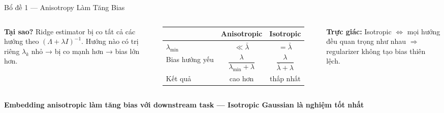 \documentclass[aspectratio=169,9pt]{beamer}
\newcommand{\takeaway}[1]{%
  \vfill
  \begin{mdframed}[
    linecolor=maccent, linewidth=1.5pt,
    backgroundcolor=mlightgold,
    innertopmargin=5pt, innerbottommargin=5pt,
    innerleftmargin=10pt, innerrightmargin=10pt,
    roundcorner=3pt, skipabove=4pt, skipbelow=0pt
  ]
  \centering\small\bfseries\color{mprimary} #1
  \end{mdframed}%
}
\begin{document}
\begin{frame}{Bổ đề 1 — Anisotropy Làm Tăng Bias}
\begin{columns}[T]
\textbf{Tại sao?} Ridge estimator bị co tất cả các hướng theo $(\Lambda + \lambda I)^{-1}$. Hướng nào có trị riêng $\lambda_k$ nhỏ → bị co mạnh hơn → bias lớn hơn.

\vspace{0.8em}
\begin{tabular}{@{}lcc@{}}
\toprule
 & Anisotropic & Isotropic \\
\midrule
$\lambda_{\min}$ & $\ll \bar\lambda$ & $= \bar\lambda$ \\
Bias hướng yếu & $\dfrac{\lambda}{\lambda_{\min}+\lambda}$ & $\dfrac{\lambda}{\bar\lambda+\lambda}$ \\[6pt]
Kết quả & \textcolor{mbad}{cao hơn} & \textcolor{mgood}{thấp nhất} \\
\bottomrule
\end{tabular}

\vspace{0.7em}
\begin{accentbox}
\footnotesize\textbf{Trực giác:} Isotropic $\Leftrightarrow$ mọi hướng đều quan trọng như nhau $\Rightarrow$ regularizer không tạo bias thiên lệch.
\end{accentbox}

\end{columns}

\takeaway{Embedding anisotropic làm tăng bias với downstream task — Isotropic Gaussian là nghiệm tốt nhất}

\end{frame}
\end{document}
